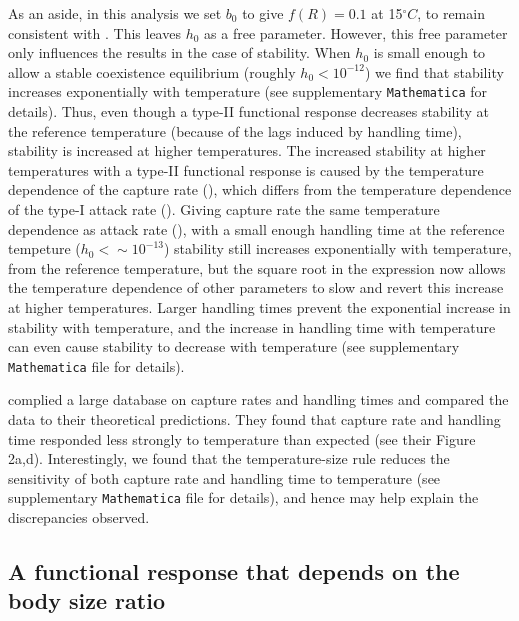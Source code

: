 \documentclass[11pt]{article}
\begin{document}
As an aside, in this analysis we set $b_0$ to give $f(R) = 0.1$ at 15$^\circ C$, to remain consistent with \cite{Gilbert2014}.
This leaves $h_0$ as a free parameter. 
However, this free parameter only influences the results in the case of stability.
When $h_0$ is small enough to allow a stable coexistence equilibrium (roughly $h_0 <10^{-12}$) we find that stability increases exponentially with temperature (see supplementary \texttt{Mathematica} for details).
Thus, even though a type-II functional response decreases stability at the reference temperature (because of the lags induced by handling time), stability is increased at higher temperatures. 
The increased stability at higher temperatures with a type-II functional response is caused by the temperature dependence of the capture rate (\cite{Rall2012}), which differs from the temperature dependence of the type-I attack rate (\cite{Gilbert2014}).
Giving capture rate the same temperature dependence as attack rate (\cite{Gilbert2014}), with a small enough handling time at the reference tempeture ($h_0 <\sim10^{-13}$) stability still increases exponentially with temperature, from the reference temperature, but the square root in the expression now allows the temperature dependence of other parameters to slow and revert this increase at higher temperatures.
Larger handling times prevent the exponential increase in stability with temperature, and the increase in handling time with temperature can even cause stability to decrease with temperature (see supplementary \texttt{Mathematica} file for details). 

\cite{Rall2012} complied a large database on capture rates and handling times and compared the data to their theoretical predictions.
They found that capture rate and handling time responded less strongly to temperature than expected (see their Figure 2a,d).
Interestingly, we found that the temperature-size rule reduces the sensitivity of both capture rate and handling time to temperature (see supplementary \texttt{Mathematica} file for details), and hence may help explain the discrepancies observed. 

\subsection*{A functional response that depends on the body size ratio}
\end{document}
